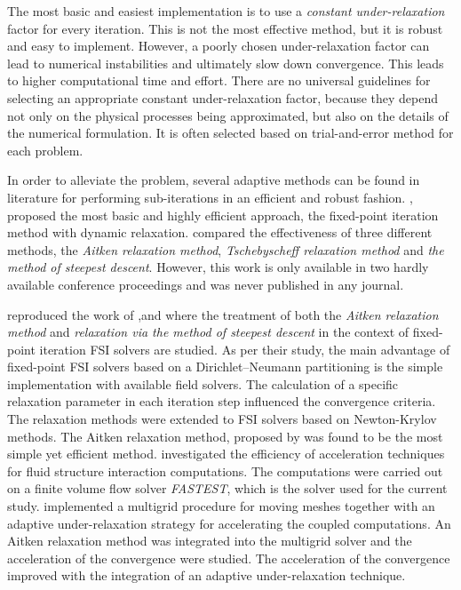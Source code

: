The most basic and easiest implementation is to use a \textit{constant under-relaxation} factor for every iteration. This is not the most effective method, but it is robust and easy to implement. However, a poorly chosen under-relaxation factor can lead to numerical instabilities and ultimately slow down convergence. This leads to higher computational time and effort. There are no universal guidelines for selecting an appropriate constant under-relaxation factor, because they depend not only on the physical processes being approximated, but also on the details of the numerical formulation. It is often selected based on trial-and-error method for each problem.

In order to alleviate the problem, several adaptive methods can be found in literature for performing sub-iterations in an efficient and robust fashion. \citet{mok2001partitioned}, \citet{wall1999partitioned} proposed the most basic and highly efficient approach, the fixed-point iteration method with
dynamic relaxation. \citet{wall1999partitioned} compared the effectiveness of three different methods, the \textit{Aitken relaxation method}, \textit{Tschebyscheff relaxation method} and \textit{the method of steepest descent}. However, this work is only available in two hardly available conference proceedings and was never published in any journal.

\citet{kuttler2008fixed} reproduced the work of \citet{mok2001partitioned},and \citet{wall1999partitioned} where the treatment of both the \textit{Aitken relaxation method} and \textit{relaxation via the method of steepest descent} in the context of fixed-point iteration FSI solvers are studied. As per their study, the main advantage of fixed-point FSI solvers based on a Dirichlet–Neumann partitioning is the simple implementation with available field solvers. The calculation of a specific relaxation parameter in each iteration step influenced the convergence criteria. The relaxation methods were extended to FSI solvers based on Newton-Krylov methods. The Aitken relaxation method, proposed by \citet{irons1969version} was found to be the most simple yet efficient method. \citet{yigit2007efficiency} investigated the efficiency of acceleration techniques for fluid structure interaction computations. The computations were carried out on a finite volume flow solver \textit{FASTEST}, which is the solver used for the current study. \citet{yigit2007efficiency} implemented a multigrid procedure for moving meshes together with an adaptive under-relaxation strategy for accelerating the coupled computations. An Aitken relaxation method was integrated into the multigrid solver and the acceleration of the convergence were studied. The acceleration of the convergence improved with the integration of an adaptive under-relaxation technique. 

